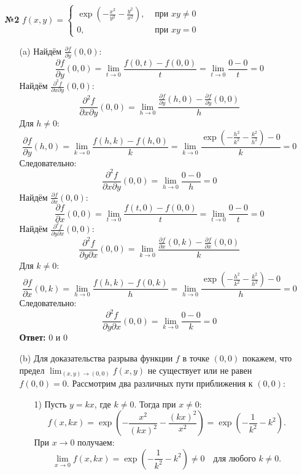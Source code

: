 \documentclass[a4paper]{article}
\renewcommand{\f}[2]{\frac{#1}{#2}}
\newcommand{\case}[1]{\begin{cases} #1 \end{cases}}
\begin{document}
\begin{enumerate}
    \item[\textbf{№2}]$f(x, y) = \case{
        \exp(-\f{x^2}{y^2}-\f{y^2}{x^2}), & \text{ при } xy \neq 0\\
        0, & \text{ при } xy = 0
    }$
    \begin{enumerate}
        \item[(a)]Найдём $\frac{\partial f}{\partial y}(0,0)$:
        \[
        \frac{\partial f}{\partial y}(0,0) = \lim_{t \to 0} \frac{f(0, t) - f(0, 0)}{t} = \lim_{t \to 0} \frac{0 - 0}{t} = 0
        \]
        Найдём $\frac{\partial^2 f}{\partial x \partial y}(0,0)$:
        \[
        \frac{\partial^2 f}{\partial x \partial y}(0,0) = \lim_{h \to 0} \frac{\frac{\partial f}{\partial y}(h, 0) - \frac{\partial f}{\partial y}(0, 0)}{h}
        \]
        Для \(h \neq 0\):
        \[
        \frac{\partial f}{\partial y}(h, 0) = \lim_{k \to 0} \frac{f(h, k) - f(h, 0)}{k} = \lim_{k \to 0} \frac{\exp\left(-\frac{h^2}{k^2} - \frac{k^2}{h^2}\right) - 0}{k} = 0
        \]
        Следовательно:
        \[
        \frac{\partial^2 f}{\partial x \partial y}(0,0) = \lim_{h \to 0} \frac{0 - 0}{h} = 0
        \]
        Найдём $\frac{\partial f}{\partial x}(0,0)$:
        \[
        \frac{\partial f}{\partial x}(0,0) = \lim_{t \to 0} \frac{f(t, 0) - f(0, 0)}{t} = \lim_{t \to 0} \frac{0 - 0}{t} = 0
        \]
        Найдём $\frac{\partial^2 f}{\partial y \partial x}(0,0)$:
        \[
        \frac{\partial^2 f}{\partial y \partial x}(0,0) = \lim_{k \to 0} \frac{\frac{\partial f}{\partial x}(0, k) - \frac{\partial f}{\partial x}(0, 0)}{k}
        \]
        Для \(k \neq 0\):
        \[
        \frac{\partial f}{\partial x}(0, k) = \lim_{h \to 0} \frac{f(h, k) - f(0, k)}{h} = \lim_{h \to 0} \frac{\exp\left(-\frac{h^2}{k^2} - \frac{k^2}{h^2}\right) - 0}{h} = 0
        \]
        Следовательно:
        \[
        \frac{\partial^2 f}{\partial y \partial x}(0,0) = \lim_{k \to 0} \frac{0 - 0}{k} = 0
        \]
        \textbf{Ответ: }$0$ и $0$\\

        \item[(b)] Для доказательства разрыва функции $f$ в точке $(0,0)$ покажем, что предел $\lim_{(x,y) \to (0,0)} f(x,y)$ не существует или не равен $f(0,0) = 0$. Рассмотрим два различных пути приближения к $(0,0)$:
        \begin{enumerate}
            \item[1)] Пусть $y = kx$, где $k \neq 0$. Тогда при $x \neq 0$:
                \[
                f(x, kx) = \exp\left(-\frac{x^2}{(kx)^2} - \frac{(kx)^2}{x^2}\right) = \exp\left(-\frac{1}{k^2} - k^2\right).
                \]
                При $x \to 0$ получаем:
                \[
                \lim_{x \to 0} f(x, kx) = \exp\left(-\frac{1}{k^2} - k^2\right) \neq 0 \quad \text{для любого } k \neq 0.
                \]


\end{enumerate}
\end{enumerate}
\end{enumerate}
\end{document}
